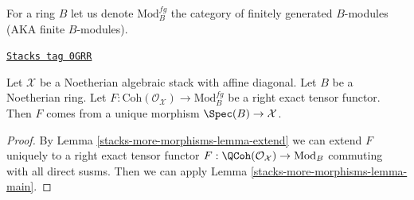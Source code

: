 For a ring $B$ let us denote $\text{Mod}^{fg}_B$ the category of
finitely generated $B$-modules (AKA finite $B$-modules).

\begin{theorem}[Main]
\label{stacks-more-morphisms-theorem-main}
\href{https://stacks.math.columbia.edu/tag/0GRR}{\texttt{Stacks tag 0GRR}}

Let $\mathcal{X}$ be a Noetherian algebraic stack with affine diagonal.
Let $B$ be a Noetherian ring.
Let $F : \text{Coh}(\mathcal{O}_\mathcal{X}) \to \text{Mod}^{fg}_B$
be a right exact tensor functor.
Then $F$ comes from a unique morphism $\Spec(B) \to \mathcal{X}$.
\end{theorem}

\begin{proof}
By Lemma \ref{stacks-more-morphisms-lemma-extend}
we can extend $F$ uniquely to a right exact tensor functor
$F : \QCoh(\mathcal{O}_\mathcal{X}) \to \text{Mod}_B$
commuting with all direct susms. Then we can apply
Lemma \ref{stacks-more-morphisms-lemma-main}.
\end{proof}



